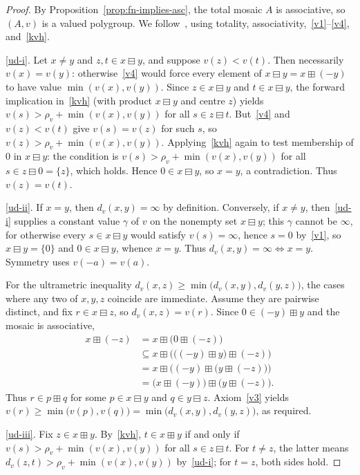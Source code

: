 \documentclass[11pt]{amsart}
\theoremstyle{plain}
\theoremstyle{definition}
\theoremstyle{remark}
\begin{document}
\begin{proof}
By Proposition~\ref{prop:fn-implies-asc}, the total mosaic \(A\) is associative, so \((A,v)\) is a valued polygroup.
We follow~\cite[Proposition~4.8]{Lin23}, using totality, associativity,~\eqref{v1}--\eqref{v4}, and~\eqref{kvh}.

\eqref{ud-i}. Let \(x\neq y\) and \(z,t\in x\boxminus y\), and suppose \(v(z)<v(t)\). Then necessarily \(v(x)=v(y)\): otherwise~\eqref{v4} would force every element of \(x\boxminus y=x\boxplus(-y)\) to have value \(\min(v(x),v(y))\). Since \(z\in x\boxminus y\) and \(t\in x\boxminus y\), the forward implication in~\eqref{kvh} (with product \(x\boxminus y\) and centre \(z\)) yields \(v(s)>\rho_v+\min(v(x),v(y))\) for all \(s\in z\boxminus t\). But~\eqref{v4} and \(v(z)<v(t)\) give \(v(s)=v(z)\) for such \(s\), so \(v(z)>\rho_v+\min(v(x),v(y))\). Applying~\eqref{kvh} again to test membership of \(0\) in \(x\boxminus y\): the condition is \(v(s)>\rho_v+\min(v(x),v(y))\) for all \(s\in z\boxminus 0=\{z\}\), which holds. Hence \(0\in x\boxminus y\), so \(x=y\), a contradiction. Thus \(v(z)=v(t)\).

\eqref{ud-ii}. If \(x=y\), then \(d_v(x,y)=\infty\) by definition. Conversely, if \(x\neq y\), then~\eqref{ud-i} supplies a constant value \(\gamma\) of \(v\) on the nonempty set \(x\boxminus y\); this \(\gamma\) cannot be \(\infty\), for otherwise every \(s\in x\boxminus y\) would satisfy \(v(s)=\infty\), hence \(s=0\) by~\eqref{v1}, so \(x\boxminus y=\{0\}\) and \(0\in x\boxminus y\), whence \(x=y\). Thus \(d_v(x,y)=\infty\Leftrightarrow x=y\). Symmetry uses \(v(-a)=v(a)\).

For the ultrametric inequality \(d_v(x,z)\ge\min\bigl(d_v(x,y),d_v(y,z)\bigr)\), the cases where any two of \(x,y,z\) coincide are immediate. Assume they are pairwise distinct, and fix \(r\in x\boxminus z\), so \(d_v(x,z)=v(r)\). Since \(0\in(-y)\boxplus y\) and the mosaic is associative,
\begin{align*}
x\boxplus(-z)
&=x\boxplus\bigl(0\boxplus(-z)\bigr)\\
&\subseteq x\boxplus\bigl(\bigl((-y)\boxplus y\bigr)\boxplus(-z)\bigr)\\
&=x\boxplus\bigl((-y)\boxplus\bigl(y\boxplus(-z)\bigr)\bigr)\\
&=\bigl(x\boxplus(-y)\bigr)\boxplus\bigl(y\boxplus(-z)\bigr).
\end{align*}
Thus \(r\in p\boxplus q\) for some \(p\in x\boxminus y\) and \(q\in y\boxminus z\). Axiom~\eqref{v3} yields \(v(r)\ge\min\bigl(v(p),v(q)\bigr)=\min\bigl(d_v(x,y),d_v(y,z)\bigr)\), as required.

\eqref{ud-iii}. Fix \(z\in x\boxplus y\). By~\eqref{kvh}, \(t\in x\boxplus y\) if and only if \(v(s)>\rho_v+\min(v(x),v(y))\) for all \(s\in z\boxminus t\). For \(t\neq z\), the latter means \(d_v(z,t)>\rho_v+\min(v(x),v(y))\) by~\eqref{ud-i}; for \(t=z\), both sides hold.
\end{proof}
\end{document}
